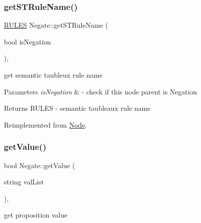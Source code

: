 \mbox{\label{class_negate_ac881a233c5a1e6f7669ea8ff70eda8f7}} 
\subsubsection{\texorpdfstring{get\+S\+T\+Rule\+Name()}{getSTRuleName()}}
{\footnotesize\ttfamily \hyperlink{proposition_2tableaux_2enum_8h_a70c93904c6a27d228050f922eb4fc3b8}{R\+U\+L\+ES} Negate\+::get\+S\+T\+Rule\+Name (\begin{DoxyParamCaption}\item[{bool}]{is\+Negation }\end{DoxyParamCaption})\hspace{0.3cm}{\ttfamily [override]}, {\ttfamily [virtual]}}



get semantic taubleux rule name 


\begin{DoxyParams}{Parameters}
{\em is\+Negation} & -\/ check if this node parent is Negation \\
\hline
\end{DoxyParams}
\begin{DoxyReturn}{Returns}
R\+U\+L\+ES -\/ semantic taubleaux rule name 
\end{DoxyReturn}


Reimplemented from \hyperlink{class_node_a25b6581950988c2536a392a6874c8072}{Node}.

\mbox{\label{class_negate_adc2bf29215e329e60e44dbf6bf8a4c85}} 
\subsubsection{\texorpdfstring{get\+Value()}{getValue()}}
{\footnotesize\ttfamily bool Negate\+::get\+Value (\begin{DoxyParamCaption}\item[{string}]{val\+List }\end{DoxyParamCaption})\hspace{0.3cm}{\ttfamily [override]}, {\ttfamily [virtual]}}



get proposition value 


